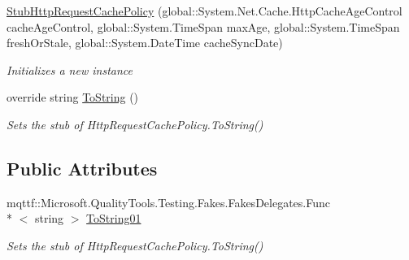\begin{DoxyCompactItemize}
\hyperlink{class_system_1_1_net_1_1_cache_1_1_fakes_1_1_stub_http_request_cache_policy_a19dbe26c90a1206eed72ab7c118e1185}{Stub\-Http\-Request\-Cache\-Policy} (global\-::\-System.\-Net.\-Cache.\-Http\-Cache\-Age\-Control cache\-Age\-Control, global\-::\-System.\-Time\-Span max\-Age, global\-::\-System.\-Time\-Span fresh\-Or\-Stale, global\-::\-System.\-Date\-Time cache\-Sync\-Date)
\begin{DoxyCompactList}\small\item\em Initializes a new instance\end{DoxyCompactList}\item 
override string \hyperlink{class_system_1_1_net_1_1_cache_1_1_fakes_1_1_stub_http_request_cache_policy_a7a5b2438b641845f8289b9f7cbf01655}{To\-String} ()
\begin{DoxyCompactList}\small\item\em Sets the stub of Http\-Request\-Cache\-Policy.\-To\-String()\end{DoxyCompactList}\end{DoxyCompactItemize}
\subsection*{Public Attributes}
\begin{DoxyCompactItemize}
\item 
mqttf\-::\-Microsoft.\-Quality\-Tools.\-Testing.\-Fakes.\-Fakes\-Delegates.\-Func\\*
$<$ string $>$ \hyperlink{class_system_1_1_net_1_1_cache_1_1_fakes_1_1_stub_http_request_cache_policy_a65cfe03a6ac846027ff494e0b8646639}{To\-String01}
\begin{DoxyCompactList}\small\item\em Sets the stub of Http\-Request\-Cache\-Policy.\-To\-String()\end{DoxyCompactList}\end{DoxyCompactItemize}
